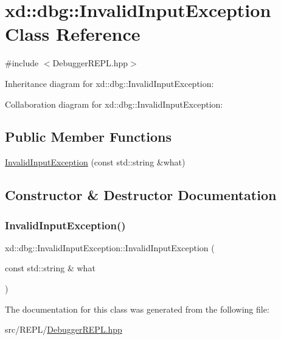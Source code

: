 \hypertarget{classxd_1_1dbg_1_1_invalid_input_exception}{}\section{xd\+:\+:dbg\+:\+:Invalid\+Input\+Exception Class Reference}
\label{classxd_1_1dbg_1_1_invalid_input_exception}


{\ttfamily \#include $<$Debugger\+R\+E\+P\+L.\+hpp$>$}



Inheritance diagram for xd\+:\+:dbg\+:\+:Invalid\+Input\+Exception\+:


Collaboration diagram for xd\+:\+:dbg\+:\+:Invalid\+Input\+Exception\+:
\subsection*{Public Member Functions}
\begin{DoxyCompactItemize}
\item 
\mbox{\hyperlink{classxd_1_1dbg_1_1_invalid_input_exception_aadc4afd12c902a2b9b8b5dfd2c37fcc2}{Invalid\+Input\+Exception}} (const std\+::string \&what)
\end{DoxyCompactItemize}


\subsection{Constructor \& Destructor Documentation}
\mbox{\label{classxd_1_1dbg_1_1_invalid_input_exception_aadc4afd12c902a2b9b8b5dfd2c37fcc2}} 
\subsubsection{\texorpdfstring{Invalid\+Input\+Exception()}{InvalidInputException()}}
{\footnotesize\ttfamily xd\+::dbg\+::\+Invalid\+Input\+Exception\+::\+Invalid\+Input\+Exception (\begin{DoxyParamCaption}\item[{const std\+::string \&}]{what }\end{DoxyParamCaption})\hspace{0.3cm}{\ttfamily [inline]}}



The documentation for this class was generated from the following file\+:\begin{DoxyCompactItemize}
\item 
src/\+R\+E\+P\+L/\mbox{\hyperlink{_debugger_r_e_p_l_8hpp}{Debugger\+R\+E\+P\+L.\+hpp}}\end{DoxyCompactItemize}

